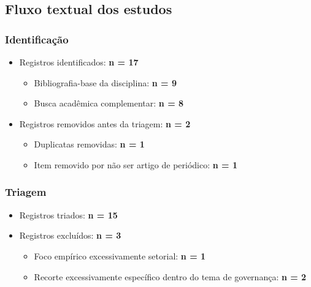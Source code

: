 \documentclass[12pt]{article}
\begin{document}
\subsection{Fluxo textual dos estudos}
\label{sec:orga173ff2}

\subsubsection{Identificação}
\label{sec:org1884ef5}
\begin{itemize}
\item Registros identificados: \textbf{n = 17}
\begin{itemize}
\item Bibliografia-base da disciplina: \textbf{n = 9}
\item Busca acadêmica complementar: \textbf{n = 8}
\end{itemize}

\item Registros removidos antes da triagem: \textbf{n = 2}
\begin{itemize}
\item Duplicatas removidas: \textbf{n = 1}
\item Item removido por não ser artigo de periódico: \textbf{n = 1}
\end{itemize}
\end{itemize}

\subsubsection{Triagem}
\label{sec:org55c0b72}
\begin{itemize}
\item Registros triados: \textbf{n = 15}
\item Registros excluídos: \textbf{n = 3}
\begin{itemize}
\item Foco empírico excessivamente setorial: \textbf{n = 1}
\item Recorte excessivamente específico dentro do tema de governança: \textbf{n = 2}
\end{itemize}
\end{itemize}
\end{document}
